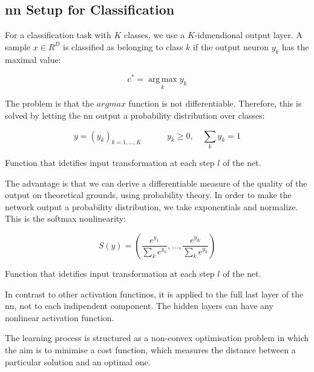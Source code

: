 \subsection{\gls{nn} Setup for Classification}
\label{nn:nnclassification}
For a classification task with $K$ classes, we use a $K$-idmendional output layer. A sample $x \in R^D$ is classified as belonging to class $k$ if the output neuron $y_k$ has the maximal value:

\begin{Equation}[H]
	\centering
	\begin{equation}
		c^*= \operatorname*{arg\,max}_k  y_k
	\end{equation}
	\label{eq:mathmodelaada}
\end{Equation}

\noindent The problem is that the $arg max$ function is not differentiable. Therefore, this is solved by letting the \gls{nn} output a probability distribution over classes:

\begin{Equation}[H]
	\centering
	\begin{equation}
		y = (y_k)_{k=1,...,K}
		\quad
		\quad
		\quad
		y_k \geq 0,
		\quad
		\sum_{k} y_k = 1
	\end{equation}
	\caption[Forward propagation.]{Function that idetifies input transformation at each step $l$ of the net.}
	\label{eq:activationfun}
\end{Equation}

\noindent The advantage is that we can derive a differentiable measure of the quality of the output on theoretical grounds, using probability theory. In order to make the network output a probability distribution, we take exponentials and normalize. This is the softmax nonlinearity:

\begin{Equation}[H]
	\centering
	\begin{equation}
		S(y) = (\frac{e^{y_1}}{\sum_k e^{y_k}},...,\frac{e^{y_K}}{\sum_k e^{y_k}})
	\end{equation}
	\caption[Forward propagation.]{Function that idetifies input transformation at each step $l$ of the net.}
	\label{eq:activationfun}
\end{Equation}

\noindent In contrast to other activation functinos, it is applied to the full last layer of the \gls{nn}, not to each indipendent component. The hidden layers can have any nonlinear activation function.

\noindent The learning process is structured as a non-convex optimisation problem in which the aim is to minimise a cost function, which measures the distance between a particular solution and an optimal one.

